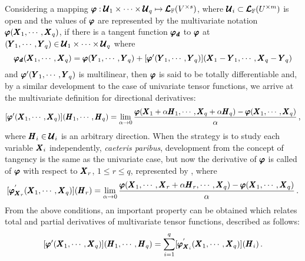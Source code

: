 Considering a mapping $\pmb{\varphi} : \pmb{\mathcal{U}}_1\times\cdots\times\pmb{\mathcal{U}}_q \mapsto \pmb{\mathcal{L}}_{\mathbb{F}}(V^{\times s})$, where $\pmb{\mathcal{U}}_i\subset\pmb{\mathcal{L}}_{\mathbb{F}}(U^{\times m})$ is open and the values of $\pmb{\varphi}$ are represented by the multivariate notation $\pmb{\varphi}(\pmb{X}_1,\cdots,\pmb{X}_q)$, if there is a tangent function $\pmb{\varphi_\mathit{d}}$ to $\pmb{\varphi}$ at $(\pmb{Y}_1,\cdots,\pmb{Y}_q)\in\pmb{\mathcal{U}}_1\times\cdots\times\pmb{\mathcal{U}}_q$ where
\begin{equation*}
\pmb{\varphi_\mathit{d}}(\pmb{X}_1,\cdots,\pmb{X}_q)=\pmb{\varphi}(\pmb{Y}_1,\cdots,\pmb{Y}_q)+[\pmb{\varphi}'(\pmb{Y}_1,\cdots,\pmb{Y}_q)](\pmb{X}_1-\pmb{Y}_1,\cdots,\pmb{X}_q-\pmb{Y}_q)
\end{equation*}
and $\pmb{\varphi}'(\pmb{Y}_1,\cdots,\pmb{Y}_q)$ is multilinear, then $\pmb{\varphi}$ is said to be totally differentiable and, by a similar development to the case of univariate tensor functions, we arrive at the multivariate definition for directional derivatives:
\begin{equation}\label{eq:totalDerivative}
[\pmb{\varphi}'(\pmb{X}_1,\cdots,\pmb{X}_q)](\pmb{H}_1,\cdots,\pmb{H}_q)=\lim_{\alpha\to 0} \dfrac{\pmb{\varphi}(\pmb{X}_1+\alpha\pmb{H}_1,\cdots,\pmb{X}_q+\alpha\pmb{H}_q)-\pmb{\varphi}(\pmb{X}_1,\cdots,\pmb{X}_q)}{\alpha}\,,
\end{equation}
where $\pmb{H}_i\in\pmb{\mathcal{U}}_i$ is an arbitrary direction. When the strategy is to study each variable $\pmb{X}_i$ independently, \emph{caeteris paribus}, development from the concept of tangency is the same as the univariate case, but now the derivative of $\pmb{\varphi}$  is called  of $\pmb{\varphi}$ with respect to $\pmb{X}_r$, $1\leqslant r\leqslant q$, represented by , where
\begin{equation}\label{eq:partialDerivative}
[\pmb{\varphi}_{\pmb{X}_r}^{'}(\pmb{X}_1,\cdots,\pmb{X}_q)]{(\pmb{H}_r)}=\lim_{\alpha\to 0} \dfrac{\pmb{\varphi}(\pmb{X}_1,\cdots,\pmb{X}_r+\alpha\pmb{H}_r,\cdots,\pmb{X}_q)-\pmb{\varphi}(\pmb{X}_1,\cdots,\pmb{X}_q)}{\alpha}\,.
\end{equation}
From the above conditions, an important property can be obtained which relates total and partial derivatives of multivariate tensor functions, described as follows:
\begin{equation}
[\pmb{\varphi}'(\pmb{X}_1,\cdots,\pmb{X}_q)](\pmb{H}_1,\cdots,\pmb{H}_q)=\sum_{i=1}^{q}[\pmb{\varphi}_{\pmb{X}_i}^{'}(\pmb{X}_1,\cdots,\pmb{X}_q)]{(\pmb{H}_i)}\,.
\end{equation}


